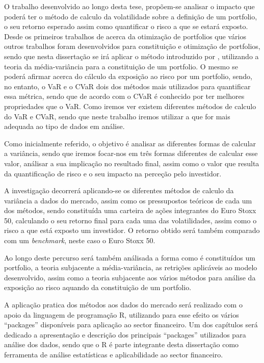 \documentclass[
  12pt,
  brazil,
  a4paper,
  openany]{book}
\begin{document}
O trabalho desenvolvido ao longo desta tese, propõem-se analisar o impacto que poderá ter o método de calculo da volatilidade sobre a definição de um portfolio, o seu retorno esperado assim como quantificar o risco a que se estará exposto. Desde os primeiros trabalhos de \textcite{Markowitz1952} acerca da otimização de portfolios que vários outros trabalhos foram desenvolvidos para constituição e otimização de portfolios, sendo que nesta dissertação se irá aplicar o método introduzido por \textcite{Markowitz1952}, utilizando a teoria da média-variância para a constituição de um portfolio. O mesmo se poderá afirmar acerca do cálculo da exposição ao risco por um portfolio, sendo, no entanto, o VaR e o CVaR dois dos métodos mais utilizados para quantificar essa métrica, sendo que de acordo com \textcite{OptVaR2000} o CVaR é conhecido por ter melhores propriedades que o VaR. Como iremos ver existem diferentes métodos de calculo do VaR e CVaR, sendo que neste trabalho iremos utilizar a que for mais adequada ao tipo de dados em análise.

Como inicialmente referido, o objetivo é analisar as diferentes formas de calcular a variância, sendo que iremos focar-nos em três formas diferentes de calcular esse valor, análisar a sua implicação no resultado final, assim como o valor que resulta da quantificação de risco e o seu impacto na perceção pelo investidor.

A investigação decorrerá aplicando-se os diferentes métodos de calculo da variância a dados do mercado, assim como os pressupostos teóricos de cada um dos métodos, sendo constituída uma carteira de ações integrantes do Euro Stoxx 50, calculando o seu retorno final para cada uma das volatilidades, assim como o risco a que está exposto um investidor. O retorno obtido será também comparado com um \emph{benchmark}, neste caso o Euro Stoxx 50.

Ao longo deste percurso será também análisada a forma como é constituídos um portfolio, a teoria subjacente a média-variância, as retrições aplicáveis ao modelo desenvolvido, assim como a teoria subjacente aos vários métodos para análise da exposição ao risco aquando da constituição de um portfolio.

A aplicação pratica dos métodos aos dados do mercado será realizado com o apoio da linguagem de programação R, utilizando para esse efeito os vários ``packages'' disponíveis para aplicação ao sector financeiro. Um dos capítulos será dedicado a apresentação e descrição dos principais ``packages'' utilizados para análise dos dados, sendo que o R é parte integrante desta dissertação como ferramenta de análise estatísticas e aplicabilidade ao sector financeiro.
\end{document}
